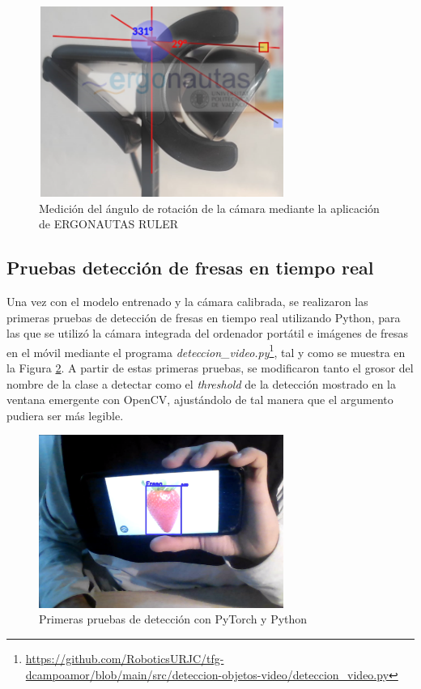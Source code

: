  \begin{figure}[H]
     \centering
     \begin{center}
       \includegraphics[width=80mm]{figs/ERGONAUTAS Medicion angulo.png}
     \end{center}
     \caption{Medición del ángulo de rotación de la cámara mediante la aplicación de ERGONAUTAS RULER}
    \label{fig:medicion_angulo_ERGONAUTAS}
  \end{figure}


\subsection{Pruebas detección de fresas en tiempo real}
\label{sec:Pruebas_Fresas_Pytorch}

Una vez con el modelo entrenado y la cámara calibrada, se realizaron las primeras pruebas de detección de fresas en tiempo real utilizando Python, para las que se utilizó la cámara integrada del ordenador portátil e imágenes de fresas en el móvil mediante el programa \textit{deteccion\_video.py}\footnote{\url{https://github.com/RoboticsURJC/tfg-dcampoamor/blob/main/src/deteccion-objetos-video/deteccion_video.py}}, tal y como se muestra en la Figura \ref{fig:primerasdetecciones_Python}. A partir de estas primeras pruebas, se modificaron tanto el grosor del nombre de la clase a detectar como el \textit{threshold} de la detección mostrado en la ventana emergente con OpenCV, ajustándolo de tal manera que el argumento pudiera ser más legible.

  \begin{figure}[H]
     \centering
     \begin{center}
       \includegraphics[width=80mm]{figs/deteccion_video fresa en foto.png}
     \end{center}
     \caption{Primeras pruebas de detección con PyTorch y Python}
    \label{fig:primerasdetecciones_Python}
  \end{figure}
  

